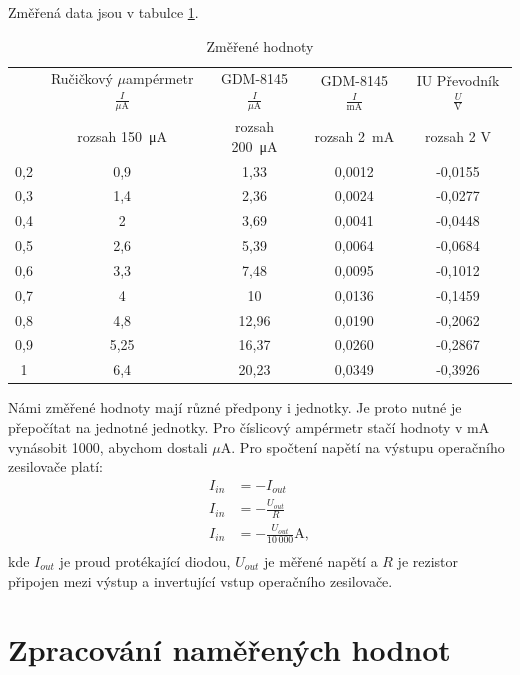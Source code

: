 \documentclass[a4paper,12pt]{article}   %
\newcommand{\tmu}{$\mu$}
\begin{document}
Změřená data jsou v tabulce \ref{tab:zmereno}.
\begin{table}[h!]
    \begin{tabular}{|c|c|c|c|c|}
        \hline
        \rule{0pt}{2.5ex}
        \multirow{2}{*}{Vstupní napětí $\frac{U}{\textrm{V}}$}& Ručičkový \tmu ampérmetr$\frac{I}{\mu\textrm{A}}$ 	&GDM-8145 $\frac{I}{\mu\textrm{A}}$	&GDM-8145 $\frac{I}{\textrm{mA}}$	&IU Převodník $\frac{U}{\textrm{V}}$  \\[.7ex]
        & rozsah  150~μA & rozsah 200~μA & rozsah  2~mA & rozsah  2 V\\\hline\hline
        0,2&0,9&1,33&0,0012&-0,0155\\\hline
        0,3&1,4&2,36&0,0024&-0,0277\\\hline
        0,4&2&3,69&0,0041&-0,0448\\\hline
        0,5&2,6&5,39&0,0064&-0,0684\\\hline
        0,6&3,3&7,48&0,0095&-0,1012\\\hline
        0,7&4&10&0,0136&-0,1459\\\hline
        0,8&4,8&12,96&0,0190&-0,2062\\\hline
        0,9&5,25&16,37&0,0260&-0,2867\\\hline
        1&6,4&20,23&0,0349&-0,3926\\\hline
    
    \end{tabular}
    \caption{Změřené hodnoty}
    \label{tab:zmereno}
\end{table}

Námi změřené hodnoty mají různé předpony i jednotky. Je proto nutné je přepočítat na jednotné jednotky. Pro číslicový ampérmetr stačí hodnoty v mA vynásobit 1000, abychom dostali \tmu A. Pro spočtení napětí na výstupu operačního zesilovače platí:
\begin{equation}
    \begin{split}
        I_{in}&=-I_{out}\\
        I_{in}&=-\frac{U_{out}}{R}\\
        I_{in}&=-\frac{U_{out}}{10\,000} \textrm{A},\\
    \end{split}
    \label{eq:iu}
\end{equation}
kde $I_{out}$ je proud protékající diodou, $U_{out}$ je měřené napětí a $R$ je rezistor připojen mezi výstup a invertující vstup operačního zesilovače.



\section{Zpracování naměřených hodnot}
\end{document}

